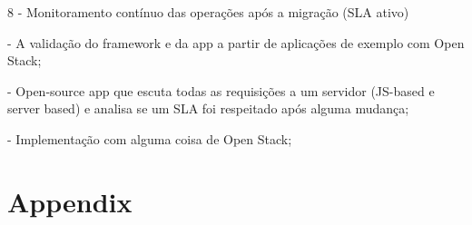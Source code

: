 \documentclass{article}
\begin{document}
8 - Monitoramento contínuo das operações após a migração (SLA ativo)

- A validação do framework e da app a partir de aplicações de exemplo com Open Stack;

- Open-source app que escuta todas as requisições a um servidor (JS-based e server based) e analisa se um SLA foi respeitado após alguma mudança; 

- Implementação com alguma coisa de Open Stack; 
 
\newpage

	

\newpage
\section{Appendix}\label{appendix}

\end{document}
